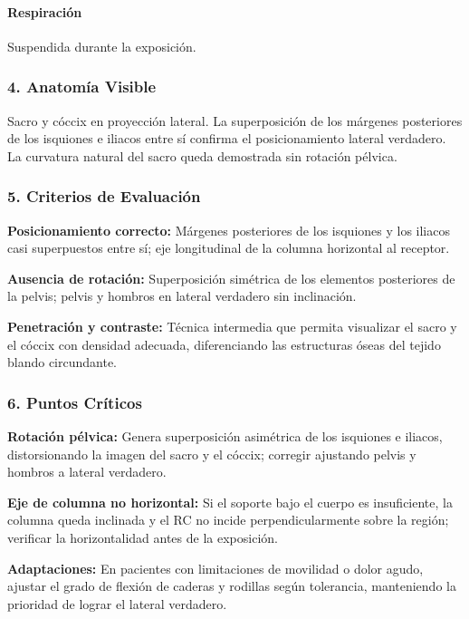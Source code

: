 	\paragraph{Respiración}
	Suspendida durante la exposición.
	
	\subsubsection*{4. Anatomía Visible}
	
	Sacro y cóccix en proyección lateral. La superposición de los márgenes posteriores de los isquiones e iliacos entre sí confirma el posicionamiento lateral verdadero. La curvatura natural del sacro queda demostrada sin rotación pélvica.
	
	\subsubsection*{5. Criterios de Evaluación}
	
	\textbf{Posicionamiento correcto:} Márgenes posteriores de los isquiones y los iliacos casi superpuestos entre sí; eje longitudinal de la columna horizontal al receptor.
	
	\textbf{Ausencia de rotación:} Superposición simétrica de los elementos posteriores de la pelvis; pelvis y hombros en lateral verdadero sin inclinación.
	
	\textbf{Penetración y contraste:} Técnica intermedia que permita visualizar el sacro y el cóccix con densidad adecuada, diferenciando las estructuras óseas del tejido blando circundante.
	
	\subsubsection*{6. Puntos Críticos}
	
	\textbf{Rotación pélvica:} Genera superposición asimétrica de los isquiones e iliacos, distorsionando la imagen del sacro y el cóccix; corregir ajustando pelvis y hombros a lateral verdadero.
	
	\textbf{Eje de columna no horizontal:} Si el soporte bajo el cuerpo es insuficiente, la columna queda inclinada y el RC no incide perpendicularmente sobre la región; verificar la horizontalidad antes de la exposición.
	
	\textbf{Adaptaciones:} En pacientes con limitaciones de movilidad o dolor agudo, ajustar el grado de flexión de caderas y rodillas según tolerancia, manteniendo la prioridad de lograr el lateral verdadero.
	
